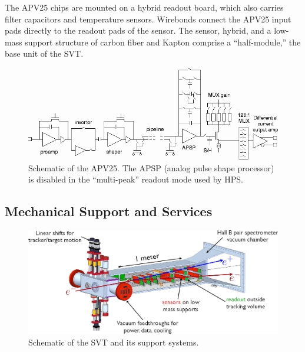 The APV25 chips are mounted on a hybrid readout board, which also carries filter capacitors and temperature sensors.
Wirebonds connect the APV25 input pads directly to the readout pads of the sensor.
The sensor, hybrid, and a low-mass support structure of carbon fiber and Kapton comprise a ``half-module,'' the base unit of the SVT.

\begin{figure}[ht]
    \includegraphics[width=\textwidth]{detector/figs/apv25}
    \caption{Schematic of the APV25. The APSP (analog pulse shape processor) is disabled in the ``multi-peak'' readout mode used by HPS.}
    \label{fig:apv25}
\end{figure}


\subsection{Mechanical Support and Services}

\begin{figure}[ht]
    \includegraphics[width=\textwidth]{detector/figs/svt_cutaway}
    \caption{Schematic of the SVT and its support systems.}
    \label{fig:svt-schematic}
\end{figure}

